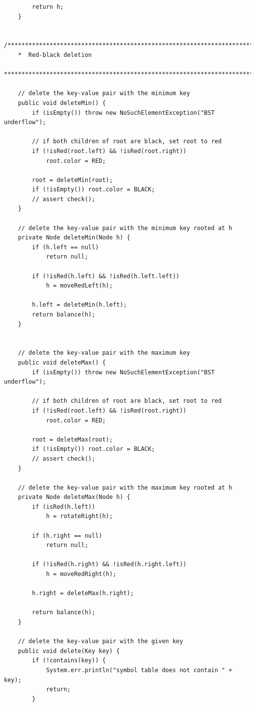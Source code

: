 \documentclass{article}
\begin{document}
\begin{lstlisting}
        return h;
    }

   /*************************************************************************
    *  Red-black deletion
    *************************************************************************/

    // delete the key-value pair with the minimum key
    public void deleteMin() {
        if (isEmpty()) throw new NoSuchElementException("BST underflow");

        // if both children of root are black, set root to red
        if (!isRed(root.left) && !isRed(root.right))
            root.color = RED;

        root = deleteMin(root);
        if (!isEmpty()) root.color = BLACK;
        // assert check();
    }

    // delete the key-value pair with the minimum key rooted at h
    private Node deleteMin(Node h) { 
        if (h.left == null)
            return null;

        if (!isRed(h.left) && !isRed(h.left.left))
            h = moveRedLeft(h);

        h.left = deleteMin(h.left);
        return balance(h);
    }


    // delete the key-value pair with the maximum key
    public void deleteMax() {
        if (isEmpty()) throw new NoSuchElementException("BST underflow");

        // if both children of root are black, set root to red
        if (!isRed(root.left) && !isRed(root.right))
            root.color = RED;

        root = deleteMax(root);
        if (!isEmpty()) root.color = BLACK;
        // assert check();
    }

    // delete the key-value pair with the maximum key rooted at h
    private Node deleteMax(Node h) { 
        if (isRed(h.left))
            h = rotateRight(h);

        if (h.right == null)
            return null;

        if (!isRed(h.right) && !isRed(h.right.left))
            h = moveRedRight(h);

        h.right = deleteMax(h.right);

        return balance(h);
    }

    // delete the key-value pair with the given key
    public void delete(Key key) { 
        if (!contains(key)) {
            System.err.println("symbol table does not contain " + key);
            return;
        }


\end{lstlisting}
\end{document}
